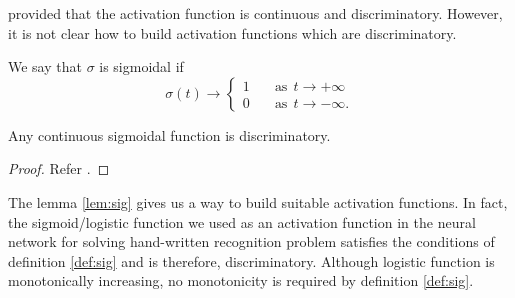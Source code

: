 provided that the activation function is continuous and discriminatory. However, it is not clear how to build activation functions which are 
discriminatory.
\begin{definition}
    \label{def:sig}
    We say that $\sigma$ is sigmoidal if 
    \begin{equation*}
        \sigma(t) \rightarrow 
         \begin{cases}
           1 &\quad \text{as} \ \ t\rightarrow +\infty\\
           0 &\quad \text{as} \ \ t\rightarrow -\infty.
         \end{cases}
    \end{equation*}
\end{definition}
\begin{lemma}
    \label{lem:sig}
    Any continuous sigmoidal function is discriminatory.
\end{lemma}
\begin{proof}
    Refer \cite{cybenko1989approximation}.
\end{proof}
The lemma \ref{lem:sig} gives us a way to build suitable activation functions. In fact, the sigmoid/logistic function we used as an activation function
in the neural network for solving hand-written recognition problem satisfies the conditions of definition \ref{def:sig} and is therefore, discriminatory. Although 
logistic function is monotonically increasing, no monotonicity is required by definition \ref{def:sig}.
